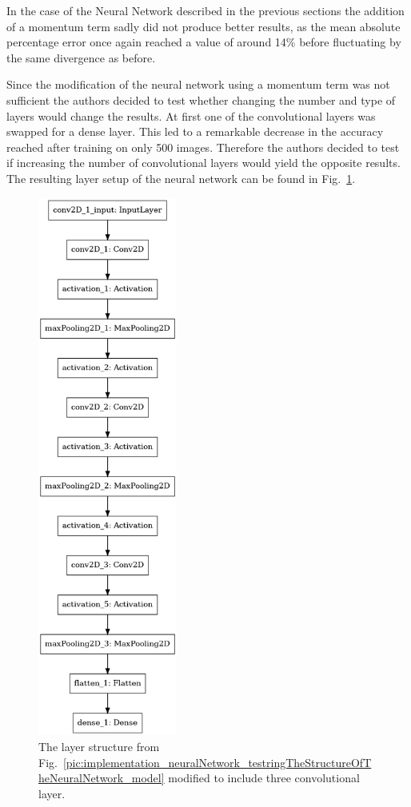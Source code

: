 In the case of the Neural Network described in the previous sections the addition of a momentum term sadly did not produce better results, as the mean absolute percentage error once again reached a value of around 14\% before fluctuating by the same divergence as before.

Since the modification of the neural network using a momentum term was not sufficient the authors decided to test whether changing the number and type of layers would change the results. At first one of the convolutional layers was swapped for a dense layer. This led to a remarkable decrease in the accuracy reached after training on only 500 images. Therefore the authors decided to test if increasing the number of convolutional layers would yield the opposite results. The resulting layer setup of the neural network can be found in Fig.~\ref{pic:implementation_neuralNetwork_modificationsToTheNN_model}.

\begin{figure}[h!]
	\centering
	\includegraphics[width=1.8in]{img/implementation_neuralNetwork_modificationsToTheNN_model.png}
	\caption{The layer structure from Fig.~\ref{pic:implementation_neuralNetwork_testringTheStructureOfTheNeuralNetwork_model} modified to include three convolutional layer.}
	\label{pic:implementation_neuralNetwork_modificationsToTheNN_model}
\end{figure}

